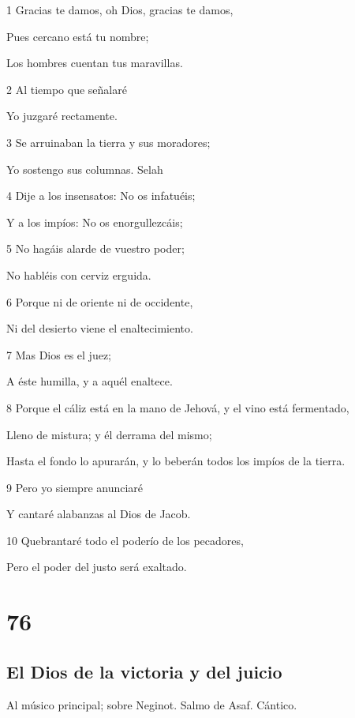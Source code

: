 \par 1 Gracias te damos, oh Dios, gracias te damos,
\par Pues cercano está tu nombre;
\par Los hombres cuentan tus maravillas.
\par 2 Al tiempo que señalaré
\par Yo juzgaré rectamente.
\par 3 Se arruinaban la tierra y sus moradores;
\par Yo sostengo sus columnas. Selah
\par 4 Dije a los insensatos: No os infatuéis;
\par Y a los impíos: No os enorgullezcáis;
\par 5 No hagáis alarde de vuestro poder;
\par No habléis con cerviz erguida.
\par 6 Porque ni de oriente ni de occidente,
\par Ni del desierto viene el enaltecimiento.
\par 7 Mas Dios es el juez;
\par A éste humilla, y a aquél enaltece.
\par 8 Porque el cáliz está en la mano de Jehová, y el vino está fermentado,
\par Lleno de mistura; y él derrama del mismo;
\par Hasta el fondo lo apurarán, y lo beberán todos los impíos de la tierra.
\par 9 Pero yo siempre anunciaré
\par Y cantaré alabanzas al Dios de Jacob.
\par 10 Quebrantaré todo el poderío de los pecadores,
\par Pero el poder del justo será exaltado.

\chapter{76}

\section*{El Dios de la victoria y del juicio}

\par Al músico principal; sobre Neginot. Salmo de Asaf. Cántico.

